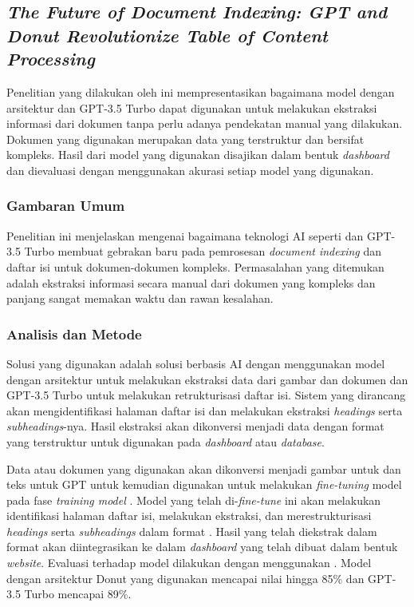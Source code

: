 \subsection{\textit{The Future of Document Indexing: GPT and Donut Revolutionize Table of Content Processing}}
\label{sec:penelitian-3}
Penelitian yang dilakukan oleh  ini mempresentasikan bagaimana model dengan arsitektur \donut{} dan GPT-3.5 Turbo dapat digunakan untuk melakukan ekstraksi informasi dari dokumen tanpa perlu adanya pendekatan manual yang dilakukan. Dokumen yang digunakan merupakan data yang terstruktur dan bersifat kompleks. Hasil dari model yang digunakan disajikan dalam bentuk 
\textit{dashboard} dan dievaluasi dengan menggunakan akurasi setiap model yang digunakan.

\subsubsection{Gambaran Umum}
Penelitian ini menjelaskan mengenai bagaimana teknologi AI seperti \donut{} dan GPT-3.5 Turbo membuat gebrakan baru pada pemrosesan \emph{document indexing} dan daftar isi untuk dokumen-dokumen kompleks. Permasalahan yang ditemukan adalah ekstraksi informasi secara manual dari dokumen yang kompleks dan panjang sangat memakan waktu dan rawan kesalahan. 

\subsubsection{Analisis dan Metode}
Solusi yang digunakan adalah solusi berbasis AI dengan menggunakan model dengan arsitektur \donut{} untuk melakukan ekstraksi data dari gambar dan dokumen dan GPT-3.5 Turbo untuk melakukan retrukturisasi daftar isi. Sistem yang dirancang akan mengidentifikasi halaman daftar isi dan melakukan ekstraksi \emph{headings} serta \emph{subheadings}-nya. Hasil ekstraksi akan dikonversi menjadi data dengan format \json{} yang terstruktur untuk digunakan pada \emph{dashboard} atau \emph{database}.  

Data atau dokumen yang digunakan akan dikonversi menjadi gambar untuk \donut{} dan teks untuk GPT untuk kemudian digunakan untuk melakukan \emph{fine-tuning} model pada fase \emph{training model} \parencite{feyisa2024future}. Model yang telah di-\emph{fine-tune} ini akan melakukan identifikasi halaman daftar isi, melakukan ekstraksi, dan merestrukturisasi \emph{headings} serta \emph{subheadings} dalam format \json. Hasil yang telah diekstrak dalam format \json{} akan diintegrasikan ke dalam \emph{dashboard} yang telah dibuat dalam bentuk \emph{website}. Evaluasi terhadap model dilakukan dengan menggunakan \accuracy{}. Model dengan arsitektur Donut yang digunakan mencapai nilai \accuracy{} hingga 85\% dan GPT-3.5 Turbo mencapai \accuracy{} 89\%. 

